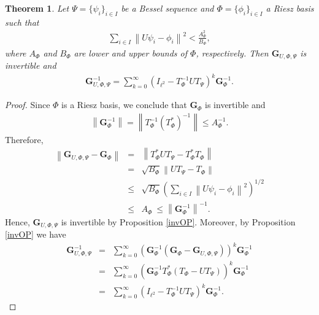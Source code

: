 \documentclass{birkjour}
\newtheorem{thm}{Theorem}[section]
\theoremstyle{definition}
\theoremstyle{remark}
\numberwithin{equation}{section}
\begin{document}
 \begin{thm}
 Let $\Psi=\{\psi_{i}\}_{i\in I}$  be a Bessel sequence and $\Phi=\{\phi_{i}\}_{i\in I}$   a Riesz basis  such that
 \begin{eqnarray*}
\sum_{i\in I}\left\|U\psi_{i}-\phi_{i}\right\|^{2}< \frac{A_{{\Phi}}^2}{B_{{\Phi}}},
 \end{eqnarray*}
 where $A_{{\Phi}}$ and $B_{{\Phi}}$ are lower and upper bounds of $\Phi$, respectively.
 Then $\mathbf{G}_{U,\Phi,\Psi}$ is invertible  and
 \begin{eqnarray*}
 \mathbf{G}_{U,\Phi,\Psi}^{-1}=\sum_{k=0}^{\infty}\left(I_{\ell^{2}}-T_{\Phi}^{-1}UT_{\Psi}\right)^{k}\mathbf{G}_{\Phi}^{-1}.
 \end{eqnarray*}
 \end{thm}
 \begin{proof}
Since $\Phi$ is a Riesz basis, we conclude that $\mathbf{G}_{\Phi}$ is invertible and
\begin{eqnarray*}\left\|\mathbf{G}_{\Phi}^{-1}\right\|=\left\|T_{\Phi}^{-1}(T_{\Phi}^{*})^{-1}\right\|\leq A_{{\Phi}}^{-1}.
\end{eqnarray*}
 Therefore,
 \begin{eqnarray*}
 \left\|\mathbf{G}_{U,\Phi,\Psi}-\mathbf{G}_{\Phi}\right\|&=&
 \left\|T_{\Phi}^{*}UT_{\Psi}-T_{\Phi}^{*}T_{\Phi}\right\|\\
 &=&\sqrt{B_{{\Phi}}}\left\|UT_{\Psi}-T_{\Phi}\right\|\\
&\leq&\sqrt{B_{{\Phi}}}\left(\sum_{i\in I}\left\|U\psi_{i}-\phi_{i}\right\|^{2}\right)^{1/2}\\
&\leq&A_{{\Phi}}\ \leq \left\|\mathbf{G}_{\Phi}^{-1}\right\|^{-1}.
 \end{eqnarray*}
Hence, $\mathbf{G}_{U,\Phi,\Psi}$ is invertible by  Proposition \ref{invOP}.  Moreover, by Proposition \ref{invOP} we have
\begin{eqnarray*}
\mathbf{G}_{U,\Phi,\Psi}^{-1}&=&\sum_{k=0}^{\infty}\left(\mathbf{G}_{\Phi}^{-1}
\left(\mathbf{G}_{\Phi}-\mathbf{G}_{U,\Phi,\Psi}\right)\right)^{k}\mathbf{G}_{\Phi}^{-1}\\
&=&\sum_{k=0}^{\infty}\left(\mathbf{G}_{\Phi}^{-1}T_{\Phi}^{*}
\left(T_{\Phi}-UT_{\Psi}\right)\right)^{k}\mathbf{G}_{\Phi}^{-1}\\
&=&\sum_{k=0}^{\infty}
\left(I_{\ell^2}-T_{\Phi}^{-1}UT_{\Psi}\right)^{k}\mathbf{G}_{\Phi}^{-1}.
\end{eqnarray*}
 \end{proof}
\end{document}
